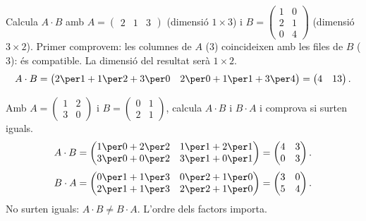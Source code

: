 \begin{exresolt}
Calcula $A\cdot B$ amb
$A=\begin{pmatrix} 2 & 1 & 3 \end{pmatrix}$ (dimensió $1\times 3$) i
$B=\begin{pmatrix} 1 & 0 \\ 2 & 1 \\ 0 & 4 \end{pmatrix}$ (dimensió $3\times 2$).
\solucio
Primer comprovem: les columnes de $A$ ($3$) coincideixen amb les files de $B$
($3$): és compatible. La dimensió del resultat serà $1\times 2$.
\[
A\cdot B=\begin{pmatrix} 2\per 1+1\per 2+3\per 0 & 2\per 0+1\per 1+3\per 4 \end{pmatrix}
        =\begin{pmatrix} 4 & 13 \end{pmatrix}.
\]
\end{exresolt}

\begin{exresolt}
Amb $A=\begin{pmatrix} 1 & 2 \\ 3 & 0 \end{pmatrix}$ i
$B=\begin{pmatrix} 0 & 1 \\ 2 & 1 \end{pmatrix}$, calcula $A\cdot B$ i $B\cdot A$
i comprova si surten iguals.
\solucio
\[
A\cdot B=\begin{pmatrix} 1\per 0+2\per 2 & 1\per 1+2\per 1 \\ 3\per 0+0\per 2 & 3\per 1+0\per 1 \end{pmatrix}
=\begin{pmatrix} 4 & 3 \\ 0 & 3 \end{pmatrix}.
\]
\[
B\cdot A=\begin{pmatrix} 0\per 1+1\per 3 & 0\per 2+1\per 0 \\ 2\per 1+1\per 3 & 2\per 2+1\per 0 \end{pmatrix}
=\begin{pmatrix} 3 & 0 \\ 5 & 4 \end{pmatrix}.
\]
No surten iguals: $A\cdot B\neq B\cdot A$. L'ordre dels factors importa.
\end{exresolt}

